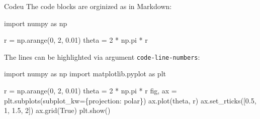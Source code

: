 \documentclass[
  ignorenonframetext,
  aspectratio=169,
]{beamer}
\newenvironment{Shaded}{}{}
\newcommand{\DecValTok}[1]{\textcolor[rgb]{0.96,0.45,0.00}{#1}}
\newcommand{\FloatTok}[1]{\textcolor[rgb]{0.96,0.45,0.00}{#1}}
\newcommand{\ImportTok}[1]{\textcolor[rgb]{0.41,0.62,0.42}{#1}}
\newcommand{\NormalTok}[1]{\textcolor[rgb]{0.24,0.22,0.21}{#1}}
\newcommand{\OperatorTok}[1]{\textcolor[rgb]{0.24,0.22,0.21}{#1}}
\newcommand{\StringTok}[1]{\textcolor[rgb]{0.60,0.59,0.10}{#1}}
\newcommand{\VariableTok}[1]{\textcolor[rgb]{0.27,0.52,0.53}{#1}}
\theoremstyle{plain}
\theoremstyle{remark}
\begin{document}
\begin{frame}[fragile]{Codeu}
\label{codeu}
The code blocks are orginized as in Markdown:

\begin{Shaded}
\begin{Highlighting}[]
\ImportTok{import}\NormalTok{ numpy }\ImportTok{as}\NormalTok{ np}

\NormalTok{r }\OperatorTok{=}\NormalTok{ np.arange(}\DecValTok{0}\NormalTok{, }\DecValTok{2}\NormalTok{, }\FloatTok{0.01}\NormalTok{)}
\NormalTok{theta }\OperatorTok{=} \DecValTok{2} \OperatorTok{*}\NormalTok{ np.pi }\OperatorTok{*}\NormalTok{ r}
\end{Highlighting}
\end{Shaded}

The lines can be highlighted via argument \texttt{code-line-numbers}:

\begin{Shaded}
\begin{Highlighting}[numbers=left,,]
\ImportTok{import}\NormalTok{ numpy }\ImportTok{as}\NormalTok{ np}
\ImportTok{import}\NormalTok{ matplotlib.pyplot }\ImportTok{as}\NormalTok{ plt}

\NormalTok{r }\OperatorTok{=}\NormalTok{ np.arange(}\DecValTok{0}\NormalTok{, }\DecValTok{2}\NormalTok{, }\FloatTok{0.01}\NormalTok{)}
\NormalTok{theta }\OperatorTok{=} \DecValTok{2} \OperatorTok{*}\NormalTok{ np.pi }\OperatorTok{*}\NormalTok{ r}
\NormalTok{fig, ax }\OperatorTok{=}\NormalTok{ plt.subplots(subplot\_kw}\OperatorTok{=}\NormalTok{\{}\StringTok{\textquotesingle{}projection\textquotesingle{}}\NormalTok{: }\StringTok{\textquotesingle{}polar\textquotesingle{}}\NormalTok{\})}
\NormalTok{ax.plot(theta, r)}
\NormalTok{ax.set\_rticks([}\FloatTok{0.5}\NormalTok{, }\DecValTok{1}\NormalTok{, }\FloatTok{1.5}\NormalTok{, }\DecValTok{2}\NormalTok{])}
\NormalTok{ax.grid(}\VariableTok{True}\NormalTok{)}
\NormalTok{plt.show()}
\end{Highlighting}
\end{Shaded}
\end{frame}
\end{document}
